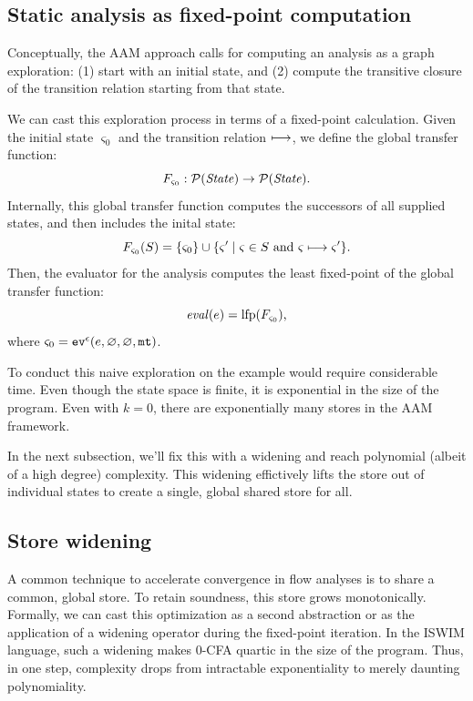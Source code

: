 \documentclass[preprint,onecolumn,9pt]{sigplanconf} %
\newcommand{\naive}{naive}
\begin{document}
\subsection{Static analysis as fixed-point computation}
\label{sec:fixpoint}

Conceptually, the AAM approach calls for computing an analysis as a graph
exploration: (1) start with an initial state, and (2) compute the transitive
closure of the transition relation starting from that state.

We can cast this exploration process in terms of a fixed-point calculation.
%
Given the initial state $\varsigma_0$ and the transition relation $\machstep$,
we define the global transfer function:
\begin{equation*}
 F_{\varsigma_0} : \mathcal{P}(\mathit{State}) \to \mathcal{P}(\mathit{State})
 \text.
\end{equation*}
Internally, this global transfer function computes the successors of all supplied states, and then includes the inital state:
\begin{equation*}
  F_{\varsigma_0}(S) = \{ \varsigma_0 \} \cup \{ \varsigma' \mathrel{|} \varsigma \in S \text{ and } \varsigma \machstep \varsigma' \}\text. 
\end{equation*}
Then, the evaluator for the analysis computes the least fixed-point of the global transfer function:
\begin{equation*}
 \eval(e) = \mathrm{lfp}(F_{\varsigma_0})\text{,}
\end{equation*}
where $\varsigma_0 = \ev[^\mtcntr]{e, \varnothing, \varnothing, \kmt}$.


To conduct this \naive{} exploration on the \Church{} example would require
considerable time.  Even though the state space is finite, it is exponential in
the size of the program.  Even with $k = 0$, there are exponentially many
stores in the AAM framework.

In the next subsection, we'll fix this with a widening and reach polynomial
(albeit of a high degree) complexity.
%
This widening effictively lifts the store out of individual states to create
a single, global shared store for all.


\subsection{Store widening}
\label{sec:storewiden}

A common technique to accelerate convergence in flow analyses is to share a
common, global store.
%
To retain soundness, this store grows monotonically.
%
Formally, we can cast this optimization as a second abstraction or as the
application of a widening operator during the fixed-point iteration.
%
In the ISWIM language, such a widening makes 0-CFA quartic in the size of the
program.
%
Thus, in one step, complexity drops from intractable exponentiality to merely
daunting polynomiality.
\end{document}
